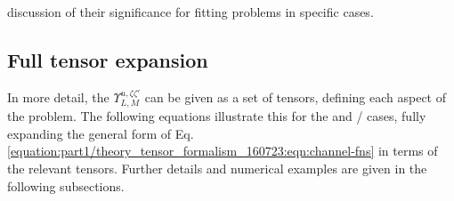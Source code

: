 \documentclass[letterpaper,table,10pt,english]{jupyterBook}
\begin{document}
discussion of their significance for fitting problems in specific cases.


\subsection{Full tensor expansion}
\label{\detokenize{part1/theory_tensor_formalism_160723:full-tensor-expansion}}\label{\detokenize{part1/theory_tensor_formalism_160723:sec-full-tensor-expansion}}
\sphinxAtStartPar
In more detail, the {\hyperref[\detokenize{backmatter/glossary:term-channel-functions}]{}} \(\varUpsilon_{L,M}^{u,\zeta\zeta'}\) can be given as a set of tensors, defining each aspect of the problem. The following equations illustrate this for the {\hyperref[\detokenize{backmatter/glossary:term-MF}]{}} and {\hyperref[\detokenize{backmatter/glossary:term-LF}]{}}/{\hyperref[\detokenize{backmatter/glossary:term-AF}]{}} cases, fully expanding the general form of Eq. \eqref{equation:part1/theory_tensor_formalism_160723:eqn:channel-fns} in terms of the relevant tensors. Further details and numerical examples are given in the following sub\sphinxhyphen{}sections.
\end{document}
